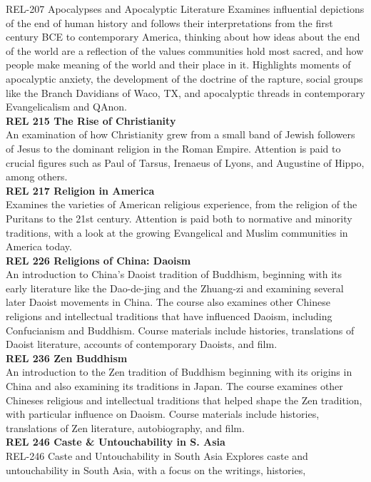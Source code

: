 \documentclass[
  letterpaper,
]{scrbook}
\begin{document}
REL-207 Apocalypses and Apocalyptic Literature Examines influential
depictions of the end of human history and follows their interpretations
from the first century BCE to contemporary America, thinking about how
ideas about the end of the world are a reflection of the values
communities hold most sacred, and how people make meaning of the world
and their place in it. Highlights moments of apocalyptic anxiety, the
development of the doctrine of the rapture, social groups like the
Branch Davidians of Waco, TX, and apocalyptic threads in contemporary
Evangelicalism and QAnon.\\
\textbf{REL 215 The Rise of Christianity}\\
An examination of how Christianity grew from a small band of Jewish
followers of Jesus to the dominant religion in the Roman Empire.
Attention is paid to crucial figures such as Paul of Tarsus, Irenaeus of
Lyons, and Augustine of Hippo, among others.\\
\textbf{REL 217 Religion in America}\\
Examines the varieties of American religious experience, from the
religion of the Puritans to the 21st century. Attention is paid both to
normative and minority traditions, with a look at the growing
Evangelical and Muslim communities in America today.\\
\textbf{REL 226 Religions of China: Daoism}\\
An introduction to China's Daoist tradition of Buddhism, beginning with
its early literature like the Dao-de-jing and the Zhuang-zi and
examining several later Daoist movements in China. The course also
examines other Chinese religions and intellectual traditions that have
influenced Daoism, including Confucianism and Buddhism. Course materials
include histories, translations of Daoist literature, accounts of
contemporary Daoists, and film.\\
\textbf{REL 236 Zen Buddhism}\\
An introduction to the Zen tradition of Buddhism beginning with its
origins in China and also examining its traditions in Japan. The course
examines other Chineses religious and intellectual traditions that
helped shape the Zen tradition, with particular influence on Daoism.
Course materials include histories, translations of Zen literature,
autobiography, and film.\\
\textbf{REL 246 Caste \& Untouchability in S. Asia}\\
REL-246 Caste and Untouchability in South Asia Explores caste and
untouchability in South Asia, with a focus on the writings, histories,
\end{document}

